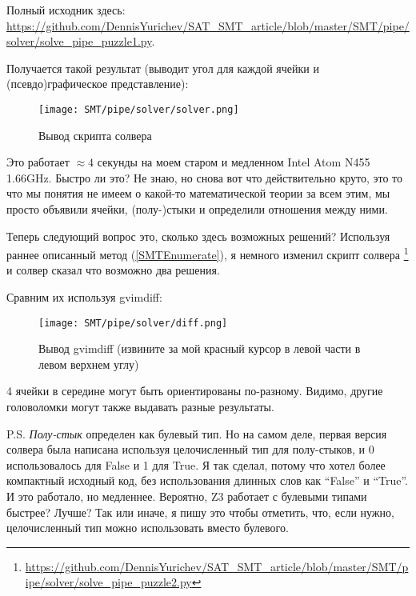 Полный исходник здесь: \url{https://github.com/DennisYurichev/SAT_SMT_article/blob/master/SMT/pipe/solver/solve_pipe_puzzle1.py}.

Получается такой результат (выводит угол для каждой ячейки и (псевдо)графическое представление):

\begin{figure}[H]
\centering
\texttt{[image: SMT/pipe/solver/solver.png]}
\caption{Вывод скрипта солвера}
\end{figure}

Это работает $\approx 4$ секунды на моем старом и медленном Intel Atom N455 1.66GHz.
Быстро ли это? Не знаю, но снова вот что действительно круто, это то что мы понятия не имеем о какой-то математической
теории за всем этим, мы просто объявили ячейки, (полу-)стыки и определили отношения между ними.

Теперь следующий вопрос это, сколько здесь возможных решений?
Используя раннее описанный метод (\ref{SMTEnumerate}), я немного изменил скрипт солвера
\footnote{\url{https://github.com/DennisYurichev/SAT_SMT_article/blob/master/SMT/pipe/solver/solve_pipe_puzzle2.py}} и солвер
сказал что возможно два решения.

Сравним их используя gvimdiff:

\begin{figure}[H]
\centering
\texttt{[image: SMT/pipe/solver/diff.png]}
\caption{Вывод gvimdiff (извините за мой красный курсор в левой части в левом верхнем углу)}
\end{figure}

4 ячейки в середине могут быть ориентированы по-разному.
Видимо, другие головоломки могут также выдавать разные результаты.

P.S.
\textit{Полу-стык} определен как булевый тип.
Но на самом деле, первая версия солвера была написана используя целочисленный тип для полу-стыков,
и 0 использовалось для False и 1 для True.
Я так сделал, потому что хотел более компактный исходный код, без использования длинных слов как ``False'' и ``True''.
И это работало, но медленнее. Вероятно, Z3 работает с булевыми типами быстрее? Лучше?
Так или иначе, я пишу это чтобы отметить, что, если нужно, целочисленный тип можно использовать вместо булевого.

